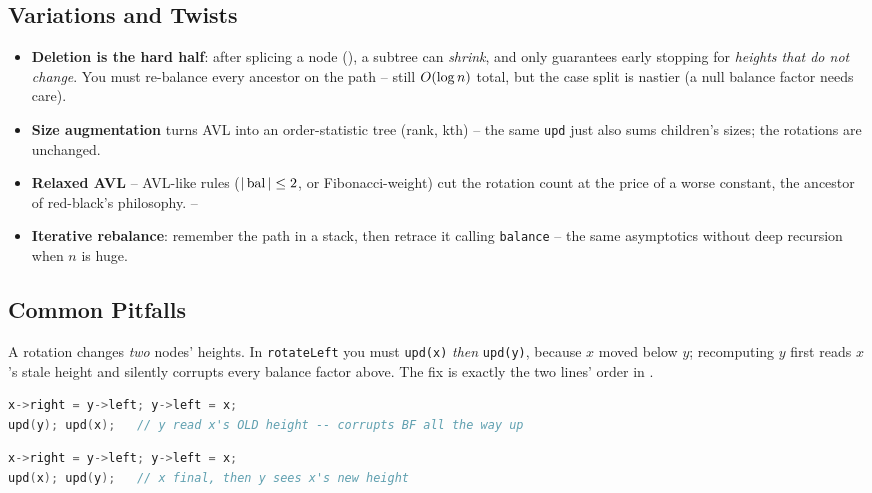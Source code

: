 \subsection{Variations and Twists}

\begin{itemize}[nosep, leftmargin=1.4em]
  \item \textbf{Deletion is the hard half}: after splicing a node (), a subtree can
        \emph{shrink}, and  only guarantees early stopping for \emph{heights that
        do not change}. You must re-balance every ancestor on the path -- still $O(\log n)$ total, but
        the case split is nastier (a null balance factor needs care). \hfill{}
  \item \textbf{Size augmentation} turns AVL into an order-statistic tree (rank, kth) -- the same
        \texttt{upd} just also sums children's sizes; the rotations are unchanged. \hfill{}
  \item \textbf{Relaxed AVL} -- AVL-like rules ($|\operatorname{bal}|\le 2$, or Fibonacci-weight) cut the rotation count
        at the price of a worse constant, the ancestor of red-black's philosophy. \hfill{}--
  \item \textbf{Iterative rebalance}: remember the path in a stack, then retrace it calling
        \texttt{balance} -- the same asymptotics without deep recursion when $n$ is huge. \hfill{}
\end{itemize}

\subsection{Common Pitfalls}\label{sec:c06-avl-pitfalls}

\begin{warningbox}
A rotation changes \emph{two} nodes' heights. In \texttt{rotateLeft} you must \texttt{upd(x)} \emph{then}
\texttt{upd(y)}, because $x$ moved below $y$; recomputing $y$ first reads $x$'s stale height and silently
corrupts every balance factor above. The fix is exactly the two lines' order in .
\end{warningbox}
\begin{lstlisting}[caption={\textcolor{warningred}{WRONG}: recompute the promoted node before the demoted one}, basicstyle=\ttfamily\small, language=C++]
x->right = y->left; y->left = x;
upd(y); upd(x);   // y read x's OLD height -- corrupts BF all the way up
\end{lstlisting}
\begin{lstlisting}[caption={\textcolor{successgreen}{RIGHT}: fix the lower node first, then its new parent}, basicstyle=\ttfamily\small, language=C++]
x->right = y->left; y->left = x;
upd(x); upd(y);   // x final, then y sees x's new height
\end{lstlisting}

